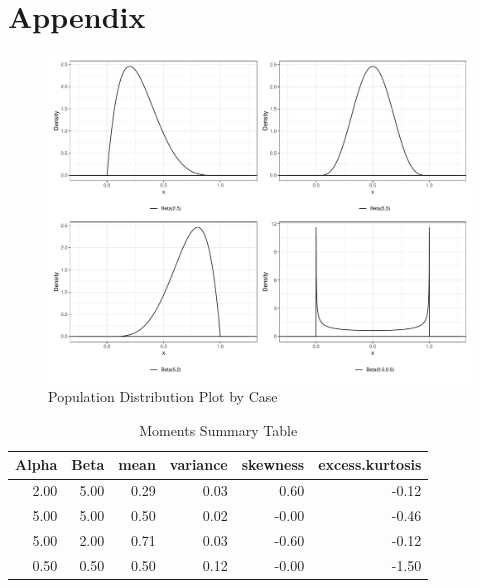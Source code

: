 \documentclass{article}\usepackage[]{graphicx}\usepackage[]{xcolor}
\makeatletter
\def\maxwidth{ %
  \ifdim\Gin@nat@width>\linewidth
    \linewidth
  \else
    \Gin@nat@width
  \fi
}
\newenvironment{knitrout}{}{} %
\makeatother
\begin{document}
\newpage
\onecolumn
\section{Appendix}

\begin{figure}[H]
\begin{center}
\begin{knitrout}
\color{fgcolor}

{\centering \includegraphics[width=\maxwidth]{figure/unnamed-chunk-5-1} 

}


\end{knitrout}
\caption{Population Distribution Plot by Case}
\label{plot1} 
\end{center}
\end{figure}




\begin{table}[H]
\centering
\begingroup\small
\begin{tabular}{rrrrrr}
  \hline
Alpha & Beta & mean & variance & skewness & excess.kurtosis \\ 
  \hline
2.00 & 5.00 & 0.29 & 0.03 & 0.60 & -0.12 \\ 
  5.00 & 5.00 & 0.50 & 0.02 & -0.00 & -0.46 \\ 
  5.00 & 2.00 & 0.71 & 0.03 & -0.60 & -0.12 \\ 
  0.50 & 0.50 & 0.50 & 0.12 & -0.00 & -1.50 \\ 
   \hline
\end{tabular}
\endgroup
\caption{Moments Summary Table} 
\label{Table 2}
\end{table}
\end{document}
